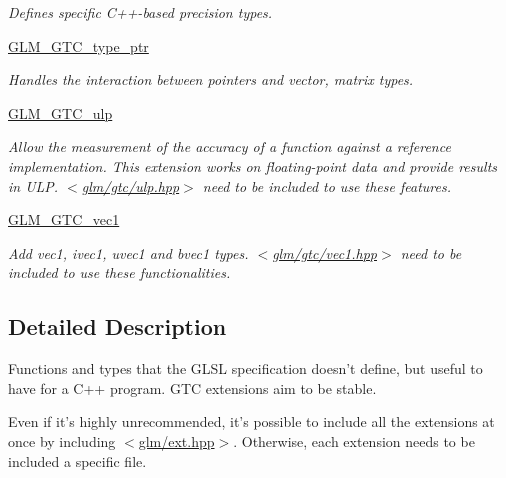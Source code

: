 \begin{DoxyCompactItemize}
\begin{DoxyCompactList}\small\item\em Defines specific C++-\/based precision types. \end{DoxyCompactList}\item 
\hyperlink{group__gtc__type__ptr}{G\-L\-M\-\_\-\-G\-T\-C\-\_\-type\-\_\-ptr}
\begin{DoxyCompactList}\small\item\em Handles the interaction between pointers and vector, matrix types. \end{DoxyCompactList}\item 
\hyperlink{group__gtc__ulp}{G\-L\-M\-\_\-\-G\-T\-C\-\_\-ulp}
\begin{DoxyCompactList}\small\item\em Allow the measurement of the accuracy of a function against a reference implementation. This extension works on floating-\/point data and provide results in U\-L\-P. $<$\hyperlink{ulp_8hpp}{glm/gtc/ulp.\-hpp}$>$ need to be included to use these features. \end{DoxyCompactList}\item 
\hyperlink{group__gtc__vec1}{G\-L\-M\-\_\-\-G\-T\-C\-\_\-vec1}
\begin{DoxyCompactList}\small\item\em Add vec1, ivec1, uvec1 and bvec1 types. $<$\hyperlink{vec1_8hpp}{glm/gtc/vec1.\-hpp}$>$ need to be included to use these functionalities. \end{DoxyCompactList}\end{DoxyCompactItemize}


\subsection{Detailed Description}
Functions and types that the G\-L\-S\-L specification doesn't define, but useful to have for a C++ program. G\-T\-C extensions aim to be stable.

Even if it's highly unrecommended, it's possible to include all the extensions at once by including $<$\hyperlink{ext_8hpp_source}{glm/ext.\-hpp}$>$. Otherwise, each extension needs to be included a specific file. 